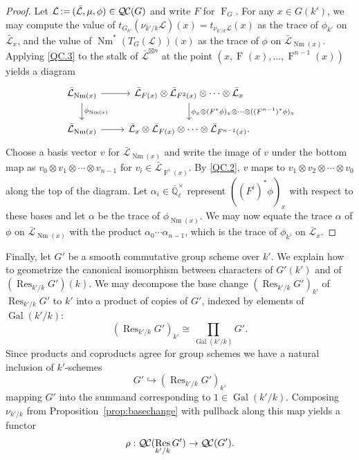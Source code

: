 \documentclass{amsart}
\theoremstyle{plain}
\theoremstyle{definition}
\theoremstyle{remark}
\newcommand{\EE}{\mathbb{\bar Q}_\ell}
\newcommand{\EEx}{\EE^\times}
\DeclareMathOperator{\Gal}{Gal}
\newcommand{\Frob}[1]{\operatorname{F}_{#1}}
\DeclareMathOperator{\Res}{Res}
\DeclareMathOperator{\Nm}{Nm}
\newcommand{\ceq}{{\, :=\, }}
\newcommand{\TrFrob}[1]{T_{#1}}
\newcommand{\qcs}[1]{{\mathcal{#1}}}
\newcommand{\gqcs}[1]{{\mathcal{\bar #1}}}
\newcommand{\QC}{{\mathcal{Q\hskip-0.8pt C}}}
\begin{document}
\begin{proof}
Let $\qcs{L} \ceq (\gqcs{L}, \mu, \phi) \in \QC(G)$ and write $F$ for $\Frob{G}$.  For any $x \in G(k')$,
we may compute the value of $t_{G_{k'}}(\nu_{k'/k}\qcs{L})(x)= t_{\nu_{k'/k}\qcs{L}}(x)$ as the trace of $\phi_{k'}$ on $\gqcs{L}_x$,
and the value of $\Nm^*(\TrFrob{G}(\qcs{L}))(x)$ as the trace of $\phi$ on $\gqcs{L}_{\Nm(x)}$.
Applying \ref{QC.3} to the stalk of $\gqcs{L}^{\boxtimes n}$ at the point $(x, \Frob{}(x), \ldots, \Frob{}^{n-1}(x))$ yields a diagram
\[
\begin{tikzcd}
\gqcs{L}_{\Nm(x)} \rar \dar{\phi_{\Nm(x)}} & \gqcs{L}_{F(x)} \otimes \gqcs{L}_{F^2(x)} \otimes \cdots \otimes \gqcs{L}_x
\dar{\phi_x \otimes (F^*\phi)_x \otimes \cdots \otimes ((F^{n-1})^*\phi)_x} \\
\gqcs{L}_{\Nm(x)} \rar & \gqcs{L}_x \otimes \gqcs{L}_{F(x)} \otimes \cdots \otimes \gqcs{L}_{F^{n-1}(x)}.
\end{tikzcd}
\]
Choose a basis vector $v$ for $\gqcs{L}_{\Nm(x)}$ and write the image of $v$ under the
bottom map as $v_0 \otimes v_1 \otimes \cdots \otimes v_{n-1}$
for $v_i \in \gqcs{L}_{\Frob{}^i(x)}$.  By \ref{QC.2}, $v$ maps to
$v_1 \otimes v_2 \otimes \cdots \otimes v_0$ along the top of the diagram.
Let $\alpha_i \in \EEx$ represent $((F^i)^*\phi)_x$ with respect to these bases and let $\alpha$ be
the trace of $\phi_{\Nm(x)}$.  We may now equate the trace $\alpha$ of $\phi$ on $\gqcs{L}_{\Nm(x)}$
with the product $\alpha_0 \cdots \alpha_{n-1}$, which is the trace of $\phi_{k'}$ on $\gqcs{L}_x$.
\end{proof}

Finally, let $G'$ be a smooth commutative group scheme over $k'$.
We explain how to geometrize the canonical isomorphism between characters of $G'(k')$ and of $(\Res_{k'/k}G')(k)$.
We may decompose the base change $(\Res_{k'/k}G')_{k'}$ of $\Res_{k'/k}G'$ to $k'$
into a product of copies of $G'$, indexed by elements of $\Gal(k'/k)$:
\[
(\Res_{k'/k}G')_{k'} \cong \prod_{\Gal(k'/k)} G'.
\]
Since products and coproducts agree for group schemes we have a natural inclusion of $k'$-schemes
\[
G' \hookrightarrow (\Res_{k'/k}G')_{k'}
\]
mapping $G'$ into the summand corresponding to $1 \in \Gal(k'/k)$.  Composing $\nu_{k'/k}$
from Proposition~\ref{prop:basechange} with pullback along this map yields a functor
\[
\rho : \QC(\Res_{k'/k}G') \to \QC(G').
\]
\end{document}
